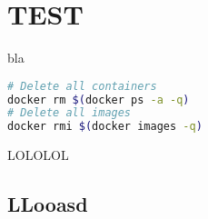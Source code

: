 \documentclass[fontsize=6pt, twoside]{scrartcl}
\begin{document}
\section{TEST}
  bla


  \begin{lstlisting}[language=sh]
# Delete all containers
docker rm $(docker ps -a -q)
# Delete all images
docker rmi $(docker images -q)
  \end{lstlisting}

  LOLOLOL
  \subsection{LLooasd}
  \lipsum[1-20]
\end{document}
